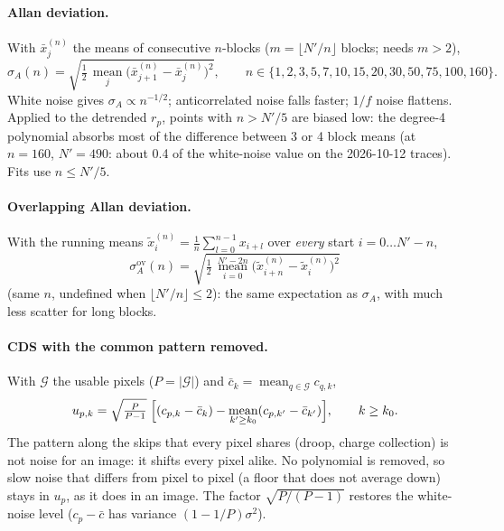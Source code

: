 \documentclass[10pt]{article}
\newcommand{\mean}{\operatorname*{mean}}
\newcommand{\ko}{k_0}
\newcommand{\G}{\mathcal G}
\begin{document}
\paragraph{Allan deviation.} With $\bar x^{(n)}_j$ the means of consecutive $n$-blocks ($m = \lfloor N'/n\rfloor$ blocks; needs $m > 2$),
\begin{equation}
\sigma_A(n) = \sqrt{\tfrac12\,\mean_j\bigl(\bar x^{(n)}_{j+1} - \bar x^{(n)}_j\bigr)^2},\qquad n \in \{1,2,3,5,7,10,15,20,30,50,75,100,160\}.
\end{equation}
White noise gives $\sigma_A \propto n^{-1/2}$; anticorrelated noise falls faster; $1/f$ noise flattens.
Applied to the detrended $r_p$, points with $n > N'/5$ are biased low: the degree-4 polynomial absorbs most of the difference between
3 or 4 block means (at $n = 160$, $N' = 490$: about 0.4 of the white-noise value on the 2026-10-12 traces). Fits use $n \le N'/5$.

\paragraph{Overlapping Allan deviation.} With the running means $\tilde x^{(n)}_i = \tfrac1n\sum_{l=0}^{n-1} x_{i+l}$ over \emph{every} start
$i = 0 \dots N'-n$,
\begin{equation}
\sigma^\text{ov}_A(n) = \sqrt{\tfrac12\,\mean_{i=0}^{N'-2n}\bigl(\tilde x^{(n)}_{i+n} - \tilde x^{(n)}_i\bigr)^2}
\end{equation}
(same $n$, undefined when $\lfloor N'/n\rfloor \le 2$): the same expectation as $\sigma_A$, with much less scatter for long blocks.

\paragraph{CDS with the common pattern removed.} With $\G$ the usable pixels ($P = |\G|$) and $\bar c_k = \mean_{q \in \G} c_{q,k}$,
\begin{equation}
u_{p,k} = \sqrt{\tfrac{P}{P-1}}\;\Bigl[(c_{p,k} - \bar c_k) - \mean_{k' \ge \ko}(c_{p,k'} - \bar c_{k'})\Bigr],\qquad k \ge \ko .
\end{equation}
The pattern along the skips that every pixel shares (droop, charge collection) is not noise for an image: it shifts every pixel alike.
No polynomial is removed, so slow noise that differs from pixel to pixel (a floor that does not average down) stays in $u_p$, as it
does in an image. The factor $\sqrt{P/(P-1)}$ restores the white-noise level ($c_{p} - \bar c$ has variance $(1 - 1/P)\sigma^2$).
\end{document}
